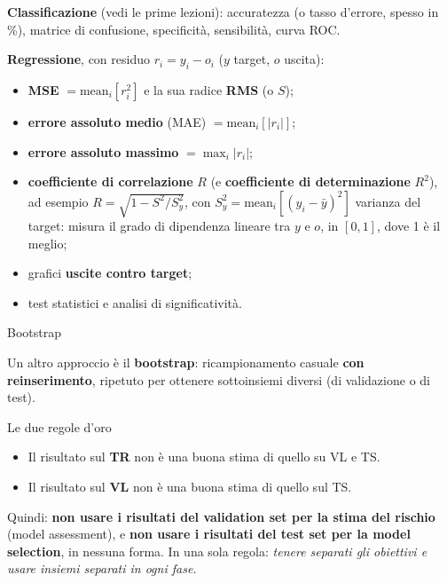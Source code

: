 \textbf{Classificazione} (vedi le prime lezioni): accuratezza (o tasso
d'errore, spesso in \%), matrice di confusione, specificità,
sensibilità, curva ROC.

\textbf{Regressione}, con residuo \(r_i = y_i - o_i\) (\(y\) target,
\(o\) uscita):

\begin{itemize}
\tightlist
\item
  \textbf{MSE} \(= \text{mean}_i[r_i^2]\) e la sua radice \textbf{RMS}
  (o \(S\));
\item
  \textbf{errore assoluto medio} (MAE) \(= \text{mean}_i[|r_i|]\);
\item
  \textbf{errore assoluto massimo} \(= \max_i |r_i|\);
\item
  \textbf{coefficiente di correlazione} \(R\) (e \textbf{coefficiente di
  determinazione} \(R^2\)), ad esempio \(R = \sqrt{1 - S^2/S_y^2}\), con
  \(S_y^2 = \text{mean}_i[(y_i - \bar y)^2]\) varianza del target:
  misura il grado di dipendenza lineare tra \(y\) e \(o\), in \([0,1]\),
  dove 1 è il meglio;
\item
  grafici \textbf{uscite contro target};
\item
  test statistici e analisi di significatività.
\end{itemize}

\begin{boxnote}{Bootstrap}

Un altro approccio è il \textbf{bootstrap}: ricampionamento casuale
\textbf{con reinserimento}, ripetuto per ottenere sottoinsiemi diversi
(di validazione o di test).

\end{boxnote}

\begin{boxabstract}{Le due regole d'oro}

\begin{itemize}
\tightlist
\item
  Il risultato sul \textbf{TR} non è una buona stima di quello su VL e
  TS.
\item
  Il risultato sul \textbf{VL} non è una buona stima di quello sul TS.
\end{itemize}

Quindi: \textbf{non usare i risultati del validation set per la stima
del rischio} (model assessment), e \textbf{non usare i risultati del
test set per la model selection}, in nessuna forma. In una sola regola:
\emph{tenere separati gli obiettivi e usare insiemi separati in ogni
fase.}

\end{boxabstract}

